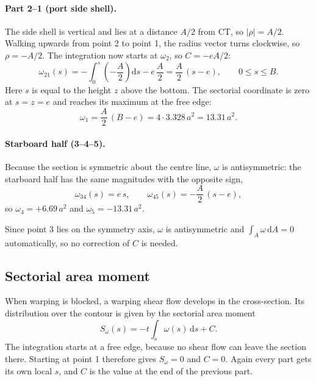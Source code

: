 \paragraph{Part 2--1 (port side shell).}
The side shell is vertical and lies at a distance $A/2$ from CT, so
$|\rho| = A/2$. Walking upwards from point 2 to point 1, the radius vector turns
clockwise, so $\rho = -A/2$. The integration now starts at $\omega_2$, so
$C = -eA/2$:
\begin{equation}
    \omega_{21}(s) = -\int_0^s \left(-\frac{A}{2}\right)\mathrm{d}s - e\,\frac{A}{2}
                   = \frac{A}{2}\,(s-e) ,
    \qquad 0 \le s \le B .
\end{equation}
Here $s$ is equal to the height $z$ above the bottom. The sectorial coordinate is
zero at $s = z = e$ and reaches its maximum at the free edge:
\begin{equation}
    \omega_1 = \frac{A}{2}\,(B-e) = 4 \cdot 3.328\,a^2 = 13.31\,a^2 .
\end{equation}

\paragraph{Starboard half (3--4--5).}
Because the section is symmetric about the centre line, $\omega$ is antisymmetric:
the starboard half has the same magnitudes with the opposite sign,
\begin{equation}
    \omega_{34}(s) = e\,s , \qquad
    \omega_{45}(s) = -\frac{A}{2}\,(s-e) ,
\end{equation}
so $\omega_4 = +6.69\,a^2$ and $\omega_5 = -13.31\,a^2$.

Since point 3 lies on the symmetry axis, $\omega$ is antisymmetric and $\int_A\omega\,\mathrm{d}A=0$ automatically, so no correction of $C$ is needed.

\subsection{Sectorial area moment}

When warping is blocked, a warping shear flow develops in the cross-section. Its distribution over the contour is given by the sectorial area moment
\begin{equation}
    S_\omega(s) = -t\int_s \omega(s)\,\mathrm{d}s + C .
\end{equation}
The integration starts at a free edge, because no shear flow can leave the section there. Starting at point 1 therefore gives $S_\omega = 0$ and $C = 0$. Again every part gets its own local $s$, and $C$ is the value at the end of the previous part.

